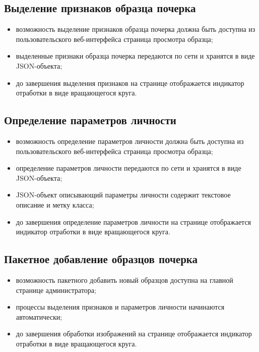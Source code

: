 \subsection{Выделение признаков образца почерка}
\label{sec:freq:extract_features}
\begin{itemize}
	\item возможность выделение признаков образца почерка должна быть доступна из пользовательского веб-интерфейса страница просмотра образца;
	\item выделенные признаки образца почерка передаются по сети и хранятся в виде JSON-объекта;
	\item до завершения выделения признаков на странице отображается индикатор отработки в виде вращающегося круга.
\end{itemize}

\subsection{Определение параметров личности}
\label{sec:freq:psiho_analysis}
\begin{itemize}
	\item возможность определение параметров личности должна быть доступна из пользовательского веб-интерфейса страница просмотра образца;
	\item определение параметров личности передаются по сети и хранятся в виде JSON-объекта;
	\item JSON-объект описывающий параметры личности содержит текстовое описание и метку класса;
	\item до завершения определение параметров личности на странице отображается индикатор отработки в виде вращающегося круга.
\end{itemize}

\subsection{Пакетное добавление образцов почерка}
\label{sec:freq:package_add}
\begin{itemize}
	\item возможность пакетного добавить новый образцов доступна на главной странице администратора;
	\item процессы выделения признаков и параметров личности начинаются автоматически;
	\item до завершения обработки изображений на странице отображается индикатор отработки в виде вращающегося круга.
\end{itemize}

